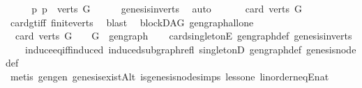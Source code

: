 \begin{isabellebody}
%
\isatagproof
{}\isamarkupfalse%
\ {\isacharminus}{\kern0pt}\isanewline
\ \ \isamarkupfalse%
\ {\isachardoublequoteopen}{\isasymexists}p{\isachardot}{\kern0pt}\ p\ {\isasymin}\ verts\ G{\isachardoublequoteclose}\isanewline
\ \ \ \ \isamarkupfalse%
\ genesis{\isacharunderscore}{\kern0pt}in{\isacharunderscore}{\kern0pt}verts\ \isamarkupfalse%
\ auto\ \isanewline
\ \ \isamarkupfalse%
\ \isamarkupfalse%
\ {\isachardoublequoteopen}card\ {\isacharparenleft}{\kern0pt}verts\ G{\isacharparenright}{\kern0pt}\ {\isachargreater}{\kern0pt}\ {}{\isachardoublequoteclose}\isanewline
\ \ \ \ \isamarkupfalse%
\ card{\isacharunderscore}{\kern0pt}gt{\isacharunderscore}{\kern0pt}{}{\isacharunderscore}{\kern0pt}iff\ finite{\isacharunderscore}{\kern0pt}verts\ \isamarkupfalse%
\ blast\isanewline
{}\isamarkupfalse%
%
\endisatagproof
{\isafoldproof}%
%
\isadelimproof
\isanewline
%
\endisadelimproof
\isanewline
{}\isamarkupfalse%
\ {\isacharparenleft}{\kern0pt}\ blockDAG{\isacharparenright}{\kern0pt}\ gen{\isacharunderscore}{\kern0pt}graph{\isacharunderscore}{\kern0pt}all{\isacharunderscore}{\kern0pt}one{\isacharcolon}{\kern0pt}\isanewline
\ \ {\isachardoublequoteopen}card\ {\isacharparenleft}{\kern0pt}verts\ {\isacharparenleft}{\kern0pt}G{\isacharparenright}{\kern0pt}{\isacharparenright}{\kern0pt}\ {\isacharequal}{\kern0pt}\ {}\ {\isasymlongleftrightarrow}\ G\ {\isacharequal}{\kern0pt}\ gen{\isacharunderscore}{\kern0pt}graph{\isachardoublequoteclose}\isanewline
%
\isadelimproof
\ \ %
\endisadelimproof
%
\isatagproof
{}\isamarkupfalse%
\ card{\isacharunderscore}{\kern0pt}{}{\isacharunderscore}{\kern0pt}singletonE\ gen{\isacharunderscore}{\kern0pt}graph{\isacharunderscore}{\kern0pt}def\ genesis{\isacharunderscore}{\kern0pt}in{\isacharunderscore}{\kern0pt}verts\ \isanewline
\ \ \ \ induce{\isacharunderscore}{\kern0pt}eq{\isacharunderscore}{\kern0pt}iff{\isacharunderscore}{\kern0pt}induced\ induced{\isacharunderscore}{\kern0pt}subgraph{\isacharunderscore}{\kern0pt}refl\ singletonD\ gen{\isacharunderscore}{\kern0pt}graph{\isacharunderscore}{\kern0pt}def\ genesis{\isacharunderscore}{\kern0pt}node{\isacharunderscore}{\kern0pt}def\isanewline
\ \ \isamarkupfalse%
\ {\isacharparenleft}{\kern0pt}metis\ gen{\isacharunderscore}{\kern0pt}gen\ genesis{\isacharunderscore}{\kern0pt}existAlt\ is{\isacharunderscore}{\kern0pt}genesis{\isacharunderscore}{\kern0pt}node{\isachardot}{\kern0pt}simps\ less{\isacharunderscore}{\kern0pt}one\ linorder{\isacharunderscore}{\kern0pt}neqE{\isacharunderscore}{\kern0pt}nat\isanewline

\end{isabellebody}
